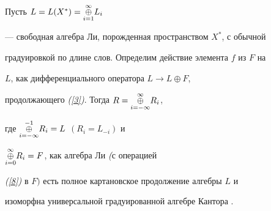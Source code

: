 \begin{thm} Пусть $L=L(X^*)=\underset{i=1}{\overset{\infty }{\oplus}}{}L_i$


--- свободная алгебра Ли, порожденная пространством $X^*$, с обычной


градуировкой по длине слов. Определим действие элемента $f$ из $F$ на


$L$, как дифференциального оператора $L \to L\oplus F$,


продолжающего {\em (\ref{3})}. Тогда $R=\underset{i=-\infty}{\overset{\infty }{\oplus}}{}R_i$,


где $\underset{i=-\infty}{\overset{-1}{\oplus}}{}R_i=L$ $(R_i=L_{-i})$ и


$\underset{i=0}{\overset{\infty }{\oplus}}{}R_i=F$, как алгебра Ли {\em (}с операцией


{\em (\ref{8})} в $F)$ есть полное картановское продолжение алгебры $L$ и


изоморфна универсальной градуированной алгебре Кантора \cite{Kan}.


\end{thm}





